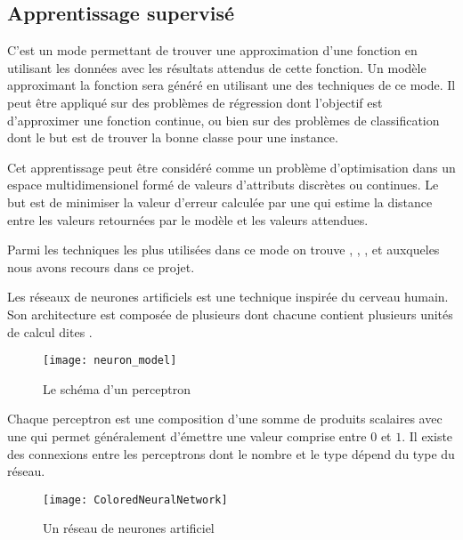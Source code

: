 \subsection{Apprentissage supervisé}

C'est un mode permettant de trouver une approximation d'une fonction en utilisant
les données avec les résultats attendus de cette fonction. Un modèle approximant
la fonction sera généré en utilisant une des techniques de ce mode.
Il peut être appliqué sur des problèmes de régression dont l'objectif est
d'approximer une fonction continue, ou bien sur des problèmes de classification
dont le but est de trouver la bonne classe pour une instance.

Cet apprentissage peut être considéré comme un problème d'optimisation
dans un espace multidimensionel formé de valeurs d'attributs discrètes ou
continues. Le but est de minimiser la valeur d'erreur calculée par une
 qui estime la distance entre les valeurs retournées
par le modèle et les valeurs attendues.

Parmi les techniques les plus utilisées dans ce mode on trouve
, ,
,
 et
 auxqueles nous avons recours dans
ce projet.

Les réseaux de neurones artificiels est une technique inspirée du cerveau humain.
Son architecture est composée de plusieurs  dont chacune
contient plusieurs unités de calcul dites .

\begin{figure}[h]
\begin{center}
\texttt{[image: neuron\_model]}
\caption{Le schéma d'un perceptron}{\cite{karpathy2016cs231n}}
\end{center}
\end{figure}

Chaque perceptron est une composition d'une somme de
produits scalaires avec une  qui permet
généralement d'émettre une valeur comprise entre $0$ et $1$.
Il existe des connexions entre les perceptrons dont le nombre et le type dépend
du type du réseau.

\begin{figure}[h]
\begin{center}
\texttt{[image: ColoredNeuralNetwork]}
\caption{Un réseau de neurones artificiel}{\cite{commonsANN}}
\end{center}
\end{figure}

